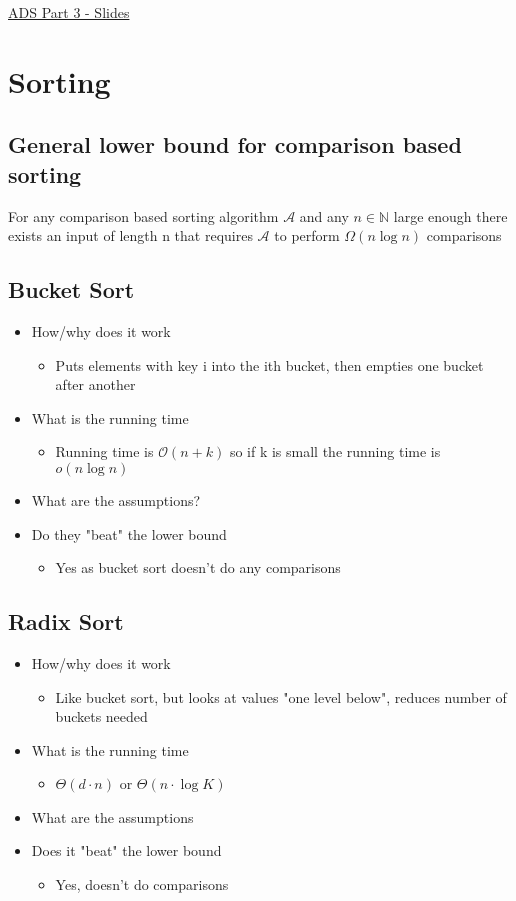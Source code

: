\documentclass{article}[18pt]
\begin{document}
\begin{center}
\underline{\huge ADS Part 3 - Slides}
\end{center}
\section{Sorting}
\subsection{General lower bound for comparison based sorting}
For any comparison based sorting algorithm $\mathcal{A}$ and any $n\in \mathbb{N}$ large enough there exists an input of length n that requires $\mathcal{A}$ to perform $\Omega(n\log n)$ comparisons
\subsection{Bucket Sort}
\begin{itemize}
	\item How/why does it work
	\begin{itemize}
		\item Puts elements with key i into the ith bucket, then empties one bucket after another
	\end{itemize}
	\item What is the running time
	\begin{itemize}
		\item Running time is $\mathcal{O}(n+k)$ so if k is small the running time is $o(n\log n)$
	\end{itemize}
	\item What are the assumptions?
	\item Do they "beat" the lower bound
	\begin{itemize}
		\item Yes as bucket sort doesn't do any comparisons
	\end{itemize}
\end{itemize}
\subsection{Radix Sort}
\begin{itemize}
	\item How/why does it work
	\begin{itemize}
		\item Like bucket sort, but looks at values "one level below", reduces number of buckets needed
	\end{itemize}
	\item What is the running time
	\begin{itemize}
		\item $\Theta(d\cdot n)$ or $\Theta(n\cdot \log K)$
	\end{itemize}
	\item What are the assumptions
	\item Does it "beat" the lower bound
	\begin{itemize}
		\item Yes, doesn't do comparisons
	\end{itemize}
\end{itemize}
\end{document}
